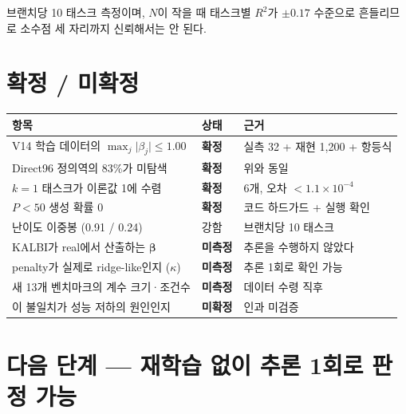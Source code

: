 \documentclass[11pt,a4paper]{article}
\theoremstyle{definition}
\newcommand{\bbeta}{\boldsymbol{\beta}}
\begin{document}
브랜치당 10 태스크 측정이며, \(N\)이 작을 때 태스크별 \(R^2\)가 \(\pm0.17\) 수준으로 흔들리므로 소수점 세 자리까지 신뢰해서는 안 된다.

\section{확정 / 미확정}

\begin{center}
\small
\begin{tabular}{@{}p{7.2cm}lp{5.4cm}@{}}
\toprule
\textbf{항목} & \textbf{상태} & \textbf{근거}\\
\midrule
V14 학습 데이터의 \(\max_j\lvert\beta_j\rvert\le1.00\) & \textcolor{grn}{\textbf{확정}} & 실측 32 + 재현 1{,}200 + 항등식\\
Direct96 정의역의 83\%가 미탐색 & \textcolor{grn}{\textbf{확정}} & 위와 동일\\
\(k=1\) 태스크가 이론값 1에 수렴 & \textcolor{grn}{\textbf{확정}} & 6개, 오차 \(<1.1\times10^{-4}\)\\
\(P<50\) 생성 확률 0 & \textcolor{grn}{\textbf{확정}} & 코드 하드가드 + 실행 확인\\
난이도 이중봉 (0.91 / 0.24) & 강함 & 브랜치당 10 태스크\\
\midrule
KALBI가 real에서 산출하는 \(\bbeta\) & \textcolor{acc}{\textbf{미측정}} & 추론을 수행하지 않았다\\
penalty가 실제로 ridge-like인지 (\(\kappa\)) & \textcolor{acc}{\textbf{미측정}} & 추론 1회로 확인 가능\\
새 13개 벤치마크의 계수 크기·조건수 & \textcolor{acc}{\textbf{미측정}} & 데이터 수령 직후\\
이 불일치가 성능 저하의 원인인지 & \textcolor{acc}{\textbf{미확정}} & 인과 미검증\\
\bottomrule
\end{tabular}
\end{center}

\section{다음 단계 --- 재학습 없이 추론 1회로 판정 가능}
\end{document}
